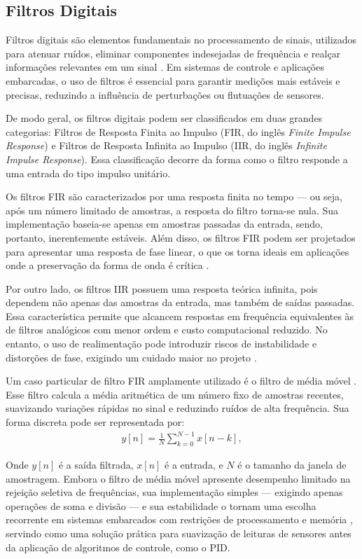 \documentclass{article}
\begin{document}
\subsection{Filtros Digitais}
Filtros digitais são elementos fundamentais no processamento de sinais, utilizados para atenuar ruídos, eliminar componentes indesejadas de frequência e realçar informações relevantes em um sinal  \cite{oppenheim1999discrete}. Em sistemas de controle e aplicações embarcadas, o uso de filtros é essencial para garantir medições mais estáveis e precisas, reduzindo a influência de perturbações ou flutuações de sensores.

De modo geral, os filtros digitais podem ser classificados em duas grandes categorias: Filtros de Resposta Finita ao Impulso (FIR, do inglês \emph{Finite Impulse Response}) e Filtros de Resposta Infinita ao Impulso (IIR, do inglês \emph{Infinite Impulse Response}). Essa classificação decorre da forma como o filtro responde a uma entrada do tipo impulso unitário.

Os filtros FIR são caracterizados por uma resposta finita no tempo — ou seja, após um número limitado de amostras, a resposta do filtro torna-se nula. Sua implementação baseia-se apenas em amostras passadas da entrada, sendo, portanto, inerentemente estáveis. Além disso, os filtros FIR podem ser projetados para apresentar uma resposta de fase linear, o que os torna ideais em aplicações onde a preservação da forma de onda é crítica \cite{smith2003digital}.

Por outro lado, os filtros IIR possuem uma resposta teórica infinita, pois dependem não apenas das amostras da entrada, mas também de saídas passadas. Essa característica permite que alcancem respostas em frequência equivalentes às de filtros analógicos com menor ordem e custo computacional reduzido. No entanto, o uso de realimentação pode introduzir riscos de instabilidade e distorções de fase, exigindo um cuidado maior no projeto \cite{proakis2007digital}.

Um caso particular de filtro FIR amplamente utilizado é o filtro de média móvel \cite{mathworks_moving_average_vs_fir}. Esse
filtro calcula a média aritmética de um número fixo de amostras recentes, suavizando variações rápidas no sinal e reduzindo ruídos de alta frequência. Sua forma discreta pode ser representada por:
\begin{align}
    y[n] = \frac{1}{N}\sum_{k=0}^{N-1}x[n-k],
\end{align}

Onde $y[n]$ é a saída filtrada, $x[n]$ é a entrada, e $N$ é o tamanho da janela de amostragem.
Embora o filtro de média móvel apresente desempenho limitado na rejeição seletiva de frequências, sua implementação simples — exigindo apenas operações de soma e divisão — e sua estabilidade o tornam
uma escolha recorrente em sistemas embarcados com restrições de processamento e memória \cite{lyons2011understanding}, servindo como uma solução prática para suavização de leituras de sensores antes da aplicação de algoritmos de
controle, como o PID.
\end{document}

